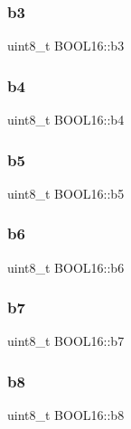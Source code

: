 \subsubsection{\texorpdfstring{b3}{b3}}
{\footnotesize\ttfamily uint8\+\_\+t B\+O\+O\+L16\+::b3}

\hypertarget{struct_b_o_o_l16_a1ea7bc124927af4c5547ddfc1d5d0423}{}\label{struct_b_o_o_l16_a1ea7bc124927af4c5547ddfc1d5d0423} 
\subsubsection{\texorpdfstring{b4}{b4}}
{\footnotesize\ttfamily uint8\+\_\+t B\+O\+O\+L16\+::b4}

\hypertarget{struct_b_o_o_l16_a27d547eece22106f5580843a67075d15}{}\label{struct_b_o_o_l16_a27d547eece22106f5580843a67075d15} 
\subsubsection{\texorpdfstring{b5}{b5}}
{\footnotesize\ttfamily uint8\+\_\+t B\+O\+O\+L16\+::b5}

\hypertarget{struct_b_o_o_l16_a6534f474b6a98663db15acb06cc44bce}{}\label{struct_b_o_o_l16_a6534f474b6a98663db15acb06cc44bce} 
\subsubsection{\texorpdfstring{b6}{b6}}
{\footnotesize\ttfamily uint8\+\_\+t B\+O\+O\+L16\+::b6}

\hypertarget{struct_b_o_o_l16_a3f8d4ed2cf7b3a1e13655e2037d2caa1}{}\label{struct_b_o_o_l16_a3f8d4ed2cf7b3a1e13655e2037d2caa1} 
\subsubsection{\texorpdfstring{b7}{b7}}
{\footnotesize\ttfamily uint8\+\_\+t B\+O\+O\+L16\+::b7}

\hypertarget{struct_b_o_o_l16_a9dde596bdadf85a589643c7da9c7f6ee}{}\label{struct_b_o_o_l16_a9dde596bdadf85a589643c7da9c7f6ee} 
\subsubsection{\texorpdfstring{b8}{b8}}
{\footnotesize\ttfamily uint8\+\_\+t B\+O\+O\+L16\+::b8}

